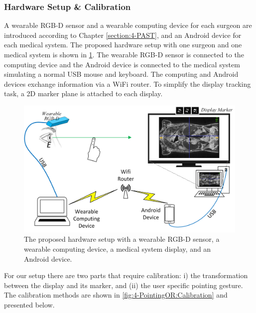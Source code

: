 \subsubsection{Hardware Setup \& Calibration}
A wearable RGB-D sensor  and a wearable computing device for each surgeon are introduced according to Chapter \ref{section:4-PAST}, and an Android device for each medical system. The proposed hardware setup with one surgeon and one medical system is shown in  \figurename{\ref{fig:4-PointingOR:Hardware}}.
The wearable RGB-D sensor is connected to the computing device and the Android device is connected to the medical system simulating a normal USB mouse and keyboard. The computing and Android devices exchange information via a WiFi router. To simplify the display tracking task, a 2D marker plane is attached to each display.
\begin{figure}[htb]
	\includegraphics[width=1.0\textwidth]{figures/4-PointingOR/Hardware.png}
	\caption{The proposed hardware setup with a wearable RGB-D sensor, a wearable computing device, a medical system display, and an Android device.}
	\label{fig:4-PointingOR:Hardware}       %
\end{figure}

For our setup there are two parts that require calibration: i) the transformation between the display and its marker, and (ii) the user specific pointing gesture. The calibration methods are shown in \figurename{\ref{fig:4-PointingOR:Calibration}} and presented below.

